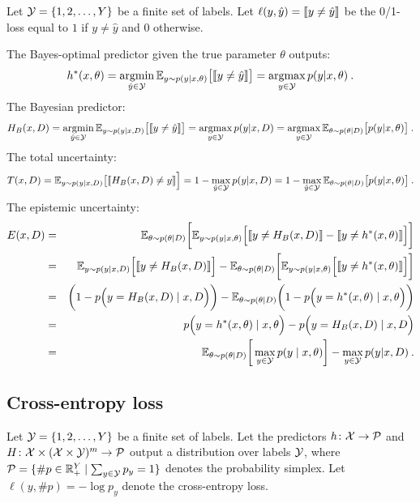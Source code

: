 Let ${\cal Y}=\{1,2,\ldots,Y\}$ be a finite set of labels. Let $\ell(y,\hat{y})=\leftbb y\neq \hat{y}\rightbb$ be the 0/1-loss equal to $1$ if $y\neq\hat{y}$ and $0$ otherwise.


The Bayes-optimal predictor given the true parameter $\theta$ outputs:
\[
  h^*(x,\theta) = 
  \argmin_{\hat{y}\in\SY} \EE_{y\sim p(y|x,\theta)}\big [\leftbb y\neq \hat{y}\rightbb\big ] = \argmax_{y\in\SY} p(y|x,\theta )\:.  %
\]
%
The Bayesian predictor:
\[
   H_B(x,D) = 
  \argmin_{\hat{y}\in\SY} \EE_{y\sim p(y|x,D)}\big [\leftbb y\neq \hat{y}\rightbb\big ] =  
  \argmax_{y\in\SY} p(y|x,D ) =
  \argmax_{y\in\SY} \EE_{\theta\sim p(\theta|D)}\big[p(y|x,\theta )\big ]\:.  
\]
%
The total uncertainty:
\[
 T(x,D)= \EE_{y\sim p(y|x,D)}\big[ \leftbb H_B(x,D)\neq y \rightbb  \Big ] = 1-\max_{\hat{y}\in\SY} p(y|x,D) = 1-\max_{\hat{y}\in\SY}\EE_{\theta\sim p(\theta|D)}\big[p(y|x,\theta )\big ] \:.
\]
%
The epistemic uncertainty:
\begin{eqnarray*}
  E(x,D) & = & \EE_{\theta \sim p(\theta|D)}\bigg [
  \EE_{y\sim p(y|x,\theta)} \Big [ 
  \leftbb y\neq H_B(x,D)\rightbb 
  - \leftbb y\neq h^*(x,\theta)\rightbb 
  \Big ]
  \bigg ] \\
  &=& \EE_{y\sim p(y|x,D)}\Big[ \leftbb y\neq H_B(x,D) \rightbb \Big ]
  - \EE_{\theta\sim p(\theta|D)}\bigg[ 
  \EE_{y\sim p(y|x,\theta)} \Big [ \leftbb y \neq h^*(x,\theta)\rightbb \Big ]
  \bigg ] \\
  &=& \bigg (1- p\Big(y=H_B(x,D)\mid x,D\Big ) \bigg ) - \EE_{\theta\sim p(\theta|D)}\bigg ( 1- p\Big (y=h^*(x,\theta) \mid x,\theta\Big )\bigg )\\
  & = & p\Big (y=h^*(x,\theta) \mid x,\theta\Big ) - p\Big(y=H_B(x,D)\mid x,D\Big ) \\
  & = & \EE_{\theta\sim p(\theta|D)}\bigg [\max_{y\in\SY} p(y\mid x,\theta) \bigg ] - \max_{y\in\SY} p(y|x,D) \:.
\end{eqnarray*}


\subsection*{Cross-entropy loss}

Let ${\cal Y}=\{1,2,\ldots,Y\}$ be a finite set of labels.
Let the predictors $h\colon{\cal X}\rightarrow {\cal P}$ and $H\colon {\cal X}\times({\cal X}\times{\cal Y})^m\rightarrow{\cal P}$ output a distribution over labels ${\cal Y}$, where ${\cal P}=\{\#p\in\mathbb{R}_+^Y\mid \sum_{y\in{\cal Y}}p_y=1\}$ denotes the probability simplex. Let $\ell(y,\#p)=-\log p_y$ denote the cross-entropy loss.

